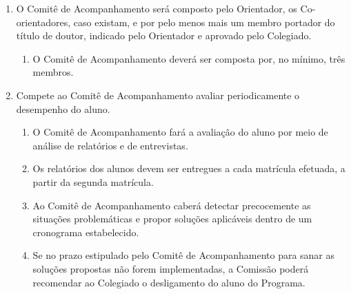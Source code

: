 \documentclass{article}
\begin{document}
\begin{enumerate}
	\item O Comitê de Acompanhamento será composto pelo Orientador, os Co-orientadores, caso existam, e por pelo menos mais um membro portador do título de doutor, indicado pelo Orientador e aprovado pelo Colegiado.
	\begin{enumerate}
		\item O Comitê de Acompanhamento deverá ser composta por, no mínimo, três membros.
	\end{enumerate}


	\item Compete ao Comitê de Acompanhamento avaliar periodicamente o desempenho do aluno.
	\begin{enumerate}
		\item O Comitê de Acompanhamento fará a avaliação do aluno por meio de análise de relatórios e de entrevistas.
		\item Os relatórios dos alunos devem ser entregues a cada matrícula efetuada, a partir da segunda matrícula.
		\item Ao Comitê de Acompanhamento caberá detectar precocemente as situações problemáticas e propor soluções aplicáveis dentro de um cronograma estabelecido.
		\item Se no prazo estipulado pelo Comitê de Acompanhamento para sanar as soluções propostas não forem implementadas, a Comissão poderá recomendar ao Colegiado o desligamento do aluno do Programa.
	\end{enumerate}

\end{enumerate}
\end{document}
